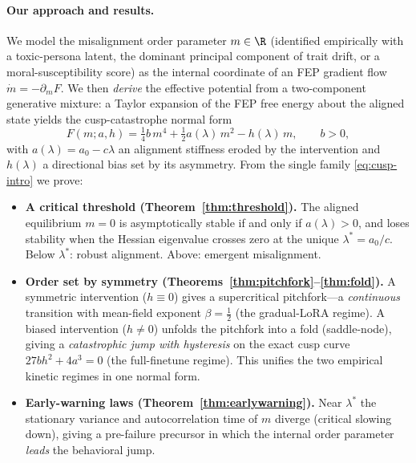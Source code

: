 \paragraph{Our approach and results.}
We model the misalignment order parameter $m\in\R$ (identified empirically with a toxic-persona
latent, the dominant principal component of trait drift, or a moral-susceptibility score) as
the internal coordinate of an FEP gradient flow $\dot m=-\partial_m F$. We then \emph{derive}
the effective potential from a two-component generative mixture: a Taylor expansion of the
FEP free energy about the aligned state yields the cusp-catastrophe normal form
\begin{equation}\label{eq:cusp-intro}
   F(m;a,h)=\tfrac14 b\,m^4+\tfrac12 a(\lambda)\,m^2-h(\lambda)\,m,\qquad b>0,
\end{equation}
with $a(\lambda)=a_0-c\lambda$ an alignment stiffness eroded by the intervention and
$h(\lambda)$ a directional bias set by its asymmetry. From the single family
\eqref{eq:cusp-intro} we prove:

\begin{itemize}[leftmargin=*,itemsep=2pt,topsep=2pt]
  \item \textbf{A critical threshold (Theorem~\ref{thm:threshold}).} The aligned equilibrium
    $m=0$ is asymptotically stable if and only if $a(\lambda)>0$, and loses stability when the
    Hessian eigenvalue crosses zero at the unique $\lambda^\ast=a_0/c$. Below $\lambda^\ast$:
    robust alignment. Above: emergent misalignment.
  \item \textbf{Order set by symmetry (Theorems~\ref{thm:pitchfork}--\ref{thm:fold}).}
    A symmetric intervention ($h\equiv0$) gives a supercritical pitchfork---a \emph{continuous}
    transition with mean-field exponent $\beta=\tfrac12$ (the gradual-LoRA regime). A biased
    intervention ($h\neq0$) unfolds the pitchfork into a fold (saddle-node), giving a
    \emph{catastrophic jump with hysteresis} on the exact cusp curve $27bh^2+4a^3=0$ (the
    full-finetune regime). This unifies the two empirical kinetic regimes in one normal form.
  \item \textbf{Early-warning laws (Theorem~\ref{thm:earlywarning}).} Near $\lambda^\ast$ the
    stationary variance and autocorrelation time of $m$ diverge (critical slowing down),
    giving a pre-failure precursor in which the internal order parameter \emph{leads} the
    behavioral jump.
\end{itemize}

